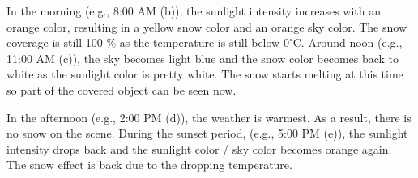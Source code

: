 \documentclass{article}
\begin{document}
In the morning (e.g., 8:00 AM (b)), the sunlight intensity increases with an orange color, resulting in a yellow
snow color and an orange sky color. The snow coverage is still 100 \% as the temperature is still below 
\(0^\circ\mathrm{C}\). Around noon (e.g., 11:00 AM (c)), the sky becomes light blue and the snow color becomes 
back to white as the sunlight color is pretty white. The snow starts melting at this time so part of the covered 
object can be seen now. 

In the afternoon (e.g., 2:00 PM (d)), the weather is warmest. As a result, there is no snow on the scene. During 
the sunset period, (e.g., 5:00 PM (e)), the sunlight intensity drops back and the sunlight color / sky color becomes
orange again. The snow effect is back due to the dropping temperature.

\begin{figure}[h]
  \centering
  \hfill
  \hfill


\end{figure}
\end{document}
